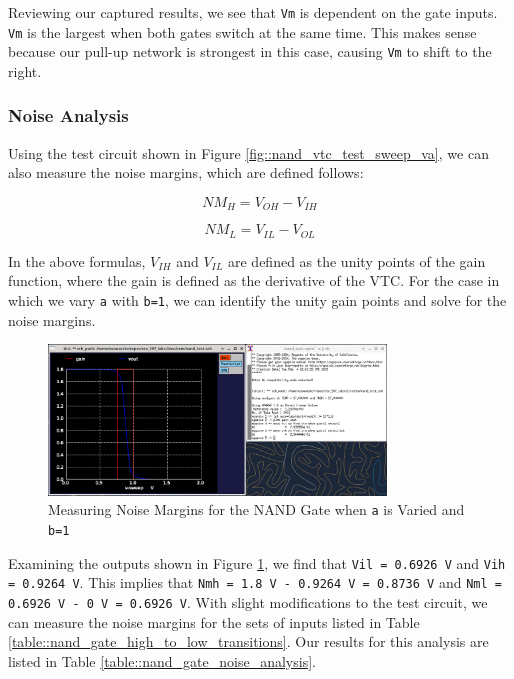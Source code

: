 \documentclass[fleqn]{article}
\begin{document}
	\noindent Reviewing our captured results, we see that \texttt{Vm} is dependent on the gate inputs. \texttt{Vm} is the largest when both gates switch at the same time. This makes sense because our pull-up network is strongest in this case, causing \texttt{Vm} to shift to the right.
	
	\subsubsection{Noise Analysis}
	\label{section::nand_noise_analysis}
	
	Using the test circuit shown in Figure \ref{fig::nand_vtc_test_sweep_va}, we can also measure the noise margins, which are defined follows:
	
	\begin{equation}
		NM_H = V_{OH} - V_{IH}
		\label{eq::noise_margin_high}
	\end{equation}
	
	\begin{equation}
		NM_L = V_{IL} - V_{OL}
		\label{eq::noise_margin_low}
	\end{equation}
	
	In the above formulas, $V_{IH}$ and $V_{IL}$ are defined as the unity points of the gain function, where the gain is defined as the derivative of the VTC. For the case in which we vary \texttt{a} with \texttt{b=1}, we can identify the unity gain points and solve for the noise margins.
	
	\begin{figure}[H]
		\centerline{\includegraphics[width=0.8\textwidth]{nand_noise_analysis_sweep_va.png}}
		\caption{Measuring Noise Margins for the NAND Gate when \texttt{a} is Varied and \texttt{b=1}}	\label{fig::nand_noise_analysis_sweep_va}
	\end{figure}
	
	Examining the outputs shown in Figure \ref{fig::nand_noise_analysis_sweep_va}, we find that \texttt{Vil = 0.6926 V} and \texttt{Vih = 0.9264 V}. This implies that \texttt{Nmh = 1.8 V - 0.9264 V = 0.8736 V} and \texttt{Nml = 0.6926 V - 0 V = 0.6926 V}. With slight modifications to the test circuit, we can measure the noise margins for the sets of inputs listed in Table \ref{table::nand_gate_high_to_low_transitions}. Our results for this analysis are listed in Table \ref{table::nand_gate_noise_analysis}.
	
\end{document}

